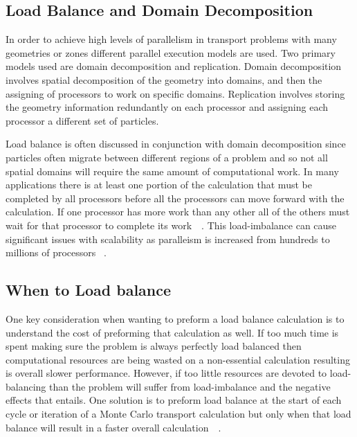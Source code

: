 \subsection{ \textbf{ Load Balance and Domain Decomposition} }

In order to achieve high levels of parallelism in transport problems with many geometries or zones different parallel execution models are used.
%
Two primary models used are domain decomposition and replication.
%
Domain decomposition involves spatial decomposition of the geometry into domains, and then the assigning of processors to work on specific domains.
%
Replication involves storing the geometry information redundantly on each processor and assigning each processor a different set of particles.
~\cite{o2005dynamic}
~\cite{procassini2005load}

Load balance is often discussed in conjunction with domain decomposition since particles often migrate between different regions of a problem and so not all spatial domains will require the same amount of computational work.
%
In many applications there is at least one portion of the calculation that must be completed by all processors before all the processors can move forward with the calculation.
%
If one processor has more work than any other all of the others must wait for that processor to complete its work~\cite{o2005dynamic}~\cite{procassini2005load}.
%
This load-imbalance can cause significant issues with scalability as paralleism is increased from hundreds to millions of processors ~\cite{o2013scalable}.
%

\subsection*{When to Load balance}

%
One key consideration when wanting to preform a load balance calculation is to understand the cost of preforming that calculation as well.
%
If too much time is spent making sure the problem is always perfectly load balanced then computational resources are being wasted on a non-essential calculation resulting is overall slower performance.
%
However, if too little resources are devoted to load-balancing than the problem will suffer from load-imbalance and the negative effects that entails.
%
One solution is to preform load balance at the start of each cycle or iteration of a Monte Carlo transport calculation but only when that load balance will result in a faster overall calculation~\cite{o2005dynamic}~\cite{procassini2005load}.
%

